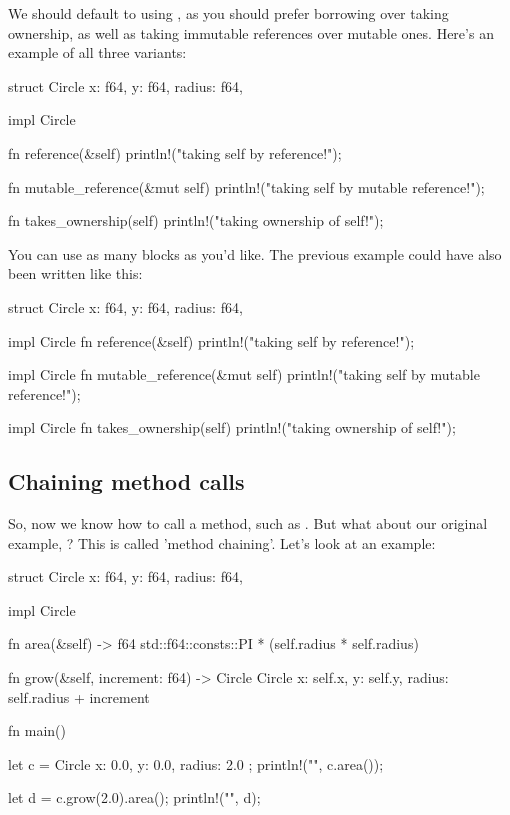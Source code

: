\blank

We should default to using , as you should prefer borrowing over taking ownership, as well as taking immutable references over 
mutable ones. Here's an example of all three variants:

\begin{rustc}
struct Circle {
    x: f64,
    y: f64,
    radius: f64,
}

impl Circle {
    fn reference(&self) {
       println!("taking self by reference!");
    }

    fn mutable_reference(&mut self) {
       println!("taking self by mutable reference!");
    }

    fn takes_ownership(self) {
       println!("taking ownership of self!");
    }
}
\end{rustc}

You can use as many  blocks as you'd like. The previous example could have also been written like this:

\begin{rustc}
struct Circle {
    x: f64,
    y: f64,
    radius: f64,
}

impl Circle {
    fn reference(&self) {
       println!("taking self by reference!");
    }
}

impl Circle {
    fn mutable_reference(&mut self) {
       println!("taking self by mutable reference!");
    }
}

impl Circle {
    fn takes_ownership(self) {
       println!("taking ownership of self!");
    }
}
\end{rustc}

\subsection*{Chaining method calls}

So, now we know how to call a method, such as . But what about our original example, ? This is called 
'method chaining'. Let's look at an example:

\begin{rustc}
struct Circle {
    x: f64,
    y: f64,
    radius: f64,
}

impl Circle {
    fn area(&self) -> f64 {
        std::f64::consts::PI * (self.radius * self.radius)
    }

    fn grow(&self, increment: f64) -> Circle {
        Circle { x: self.x, y: self.y, radius: self.radius + increment }
    }
}

fn main() {
    let c = Circle { x: 0.0, y: 0.0, radius: 2.0 };
    println!("{}", c.area());

    let d = c.grow(2.0).area();
    println!("{}", d);
}
\end{rustc}

